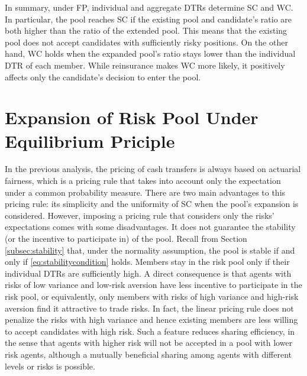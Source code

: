 \documentclass[fleqn,mnsc,nonblindrev]{informs4}
\begin{document}
In summary, under FP, individual and aggregate DTRs determine SC and WC. In particular, the pool reaches SC if the existing pool and candidate's ratio are both higher than the ratio of the extended pool. This means that the existing pool does not accept candidates with sufficiently risky positions. On the other hand, WC holds when the expanded pool's ratio stays lower than the individual DTR of each member. While reinsurance makes WC more likely, it positively affects only the candidate's decision to enter the pool.

\section{Expansion of Risk Pool Under Equilibrium Priciple}\label{sec:equilibrium}

In the previous analysis, the pricing of cash transfers is always based on actuarial fairness, which is a pricing rule that takes into account only the expectation under a common probability measure. There are two main advantages to this pricing rule: its simplicity and the uniformity of SC when the pool's expansion is considered. However, imposing a pricing rule that considers only the risks' expectations comes with some disadvantages. It does not guarantee the stability (or the incentive to participate in) of the pool. Recall from Section \ref{subsec:stability} that, under the normality assumption, the pool is stable if and only if \eqref{eq:stabilitycondition} holds. Members stay in the risk pool only if their individual DTRs are sufficiently high. A direct consequence is that agents with risks of low variance and low-risk aversion have less incentive to participate in the risk pool, or equivalently, only members with risks of high variance and high-risk aversion find it attractive to trade risks. In fact, the linear pricing rule does not penalize the risks with high variance and hence existing members are less willing to accept candidates with high risk. Such a feature reduces sharing efficiency, in the sense that agents with higher risk will not be accepted in a pool with lower risk agents, although a mutually beneficial sharing among agents with different levels or risks is possible.
\end{document}
